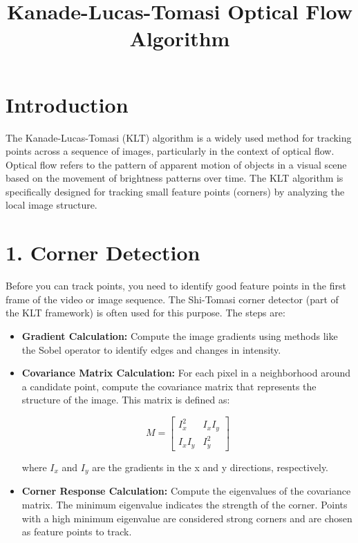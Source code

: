 \documentclass{article}
\title{Kanade-Lucas-Tomasi Optical Flow Algorithm}
\author{}
\date{}
\begin{document}
\maketitle

\section{Introduction}
The Kanade-Lucas-Tomasi (KLT) algorithm is a widely used method for tracking points across a sequence of images, particularly in the context of optical flow. Optical flow refers to the pattern of apparent motion of objects in a visual scene based on the movement of brightness patterns over time. The KLT algorithm is specifically designed for tracking small feature points (corners) by analyzing the local image structure.

\section{1. Corner Detection}
Before you can track points, you need to identify good feature points in the first frame of the video or image sequence. The Shi-Tomasi corner detector (part of the KLT framework) is often used for this purpose. The steps are:

\begin{itemize}
    \item \textbf{Gradient Calculation:} Compute the image gradients using methods like the Sobel operator to identify edges and changes in intensity.
    \item \textbf{Covariance Matrix Calculation:} For each pixel in a neighborhood around a candidate point, compute the covariance matrix that represents the structure of the image. This matrix is defined as:
    
    \[
    M = \begin{bmatrix}
    I_x^2 & I_x I_y \\
    I_x I_y & I_y^2
    \end{bmatrix}
    \]
    
    where \(I_x\) and \(I_y\) are the gradients in the x and y directions, respectively.
    
    \item \textbf{Corner Response Calculation:} Compute the eigenvalues of the covariance matrix. The minimum eigenvalue indicates the strength of the corner. Points with a high minimum eigenvalue are considered strong corners and are chosen as feature points to track.
\end{itemize}
\end{document}
